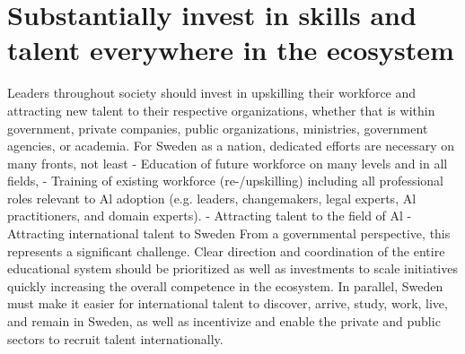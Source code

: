 \section*{Substantially invest in skills and talent everywhere in the ecosystem}
Leaders throughout society should invest in upskilling their workforce and attracting new talent to their respective organizations, whether that is within government, private companies, public organizations, ministries, government agencies, or academia.
For Sweden as a nation, dedicated efforts are necessary on many fronts, not least
- Education of future workforce on many levels and in all fields,
- Training of existing workforce (re-/upskilling) including all professional roles relevant to Al adoption (e.g. leaders, changemakers, legal experts, Al practitioners, and domain experts).
- Attracting talent to the field of Al
- Attracting international talent to Sweden
From a governmental perspective, this represents a significant challenge. Clear direction and coordination of the entire educational system should be prioritized as well as investments to scale initiatives quickly increasing the overall competence in the ecosystem.
In parallel, Sweden must make it easier for international talent to discover, arrive, study, work, live, and remain in Sweden, as well as incentivize and enable the private and public sectors to recruit talent internationally.

